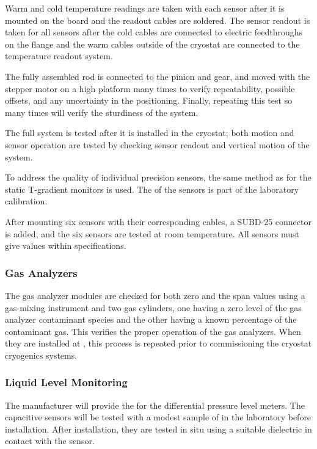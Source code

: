 Warm and cold temperature readings are taken with each sensor after it
is mounted on the  board and the readout cables are soldered.  The
sensor readout is taken for all sensors after the cold cables are
connected to electric feedthroughs on the flange and the warm cables
outside of the cryostat are connected to the temperature readout
system.

The fully assembled rod is connected to the pinion and gear, and moved
with the stepper motor on a high platform many times to verify
repeatability, possible offsets, and any uncertainty in the
positioning. Finally, repeating this test so many times will verify
the sturdiness of the system.

The full system is tested after it is installed in the cryostat; both
motion and sensor operation are tested by checking sensor readout and
vertical motion of the system.

To address the quality of individual precision sensors, the same
method as for the static T-gradient monitors is used. The 
of the sensors is part of the laboratory calibration.

After mounting six sensors with their corresponding cables, a SUBD-25
connector is added, and the six sensors are tested at room
temperature. All sensors must give values within specifications.

\subsubsection{Gas Analyzers}

The gas analyzer modules are checked for both zero and the span values
using a gas-mixing instrument and two gas cylinders, one having a zero
level of the gas analyzer contaminant species and the other %
having a known percentage of the contaminant gas. This verifies the
proper operation of the gas analyzers. When they are installed at
, this process is repeated prior to commissioning the cryostat cryogenics systems.

\subsubsection{Liquid Level Monitoring}

The manufacturer will provide the  for the differential pressure
level meters. The capacitive sensors will be tested with a modest
sample of  in the laboratory before  installation. After
installation, they are tested in situ using a suitable dielectric in
contact with the sensor.

